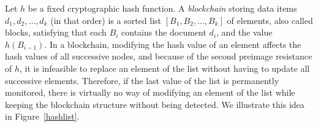 
\medskip
{} 
Let $h$ be a fixed cryptographic hash function. A {\em blockchain} storing data items $d_1,d_2,\dots, d_k$ (in that order) is a sorted list $[B_1,B_2,\ldots ,B_k]$ of elements, also called blocks, satisfying that each $B_i$ contains the document $d_i$, and the value $h(B_{i-1})$. In a blockchain, modifying the hash value of an element affects the hash values of all successive nodes, and because of the second preimage resistance of $h$, it is infeasible to replace an element of the list without having to update all successive elements. Therefore, if the last value of the list is permanently monitored, there is virtually no way of modifying an element of the list while keeping the blockchain structure without being detected. We illustrate this idea in Figure~\ref{hashlist}.


